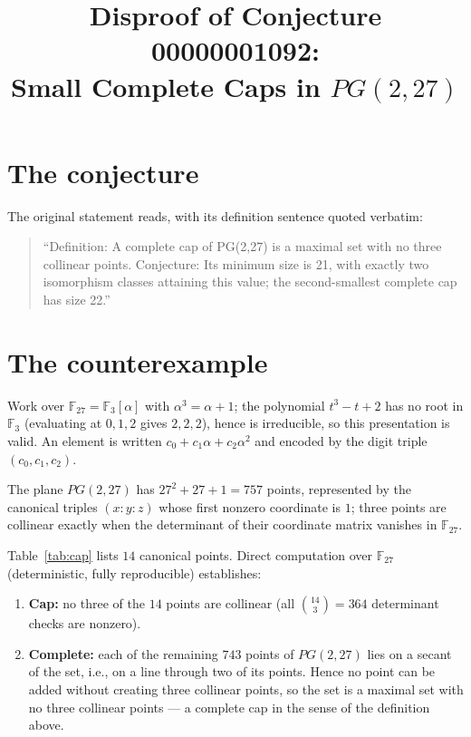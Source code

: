 \documentclass[11pt]{article}
\title{Disproof of Conjecture 00000001092:\\Small Complete Caps in $PG(2,27)$}
\author{}
\date{}
\begin{document}
\maketitle

\section{The conjecture}

The original statement reads, with its definition sentence quoted verbatim:

\begin{quote}
``Definition: A complete cap of PG(2,27) is a maximal set with no three collinear points. Conjecture: Its minimum size is 21, with exactly two isomorphism classes attaining this value; the second-smallest complete cap has size 22.''
\end{quote}

\section{The counterexample}

Work over $\mathbb{F}_{27}=\mathbb{F}_3[\alpha]$ with $\alpha^3=\alpha+1$; the polynomial $t^3-t+2$ has no root in $\mathbb{F}_3$ (evaluating at $0,1,2$ gives $2,2,2$), hence is irreducible, so this presentation is valid. An element is written $c_0+c_1\alpha+c_2\alpha^2$ and encoded by the digit triple $(c_0,c_1,c_2)$.

The plane $PG(2,27)$ has $27^2+27+1=757$ points, represented by the canonical triples $(x:y:z)$ whose first nonzero coordinate is $1$; three points are collinear exactly when the determinant of their coordinate matrix vanishes in $\mathbb{F}_{27}$.

Table~\ref{tab:cap} lists $14$ canonical points. Direct computation over $\mathbb{F}_{27}$ (deterministic, fully reproducible) establishes:

\begin{enumerate}
\item \textbf{Cap:} no three of the $14$ points are collinear (all $\binom{14}{3}=364$ determinant checks are nonzero).
\item \textbf{Complete:} each of the remaining $743$ points of $PG(2,27)$ lies on a secant of the set, i.e., on a line through two of its points. Hence no point can be added without creating three collinear points, so the set is a maximal set with no three collinear points --- a complete cap in the sense of the definition above.
\end{enumerate}
\end{document}
